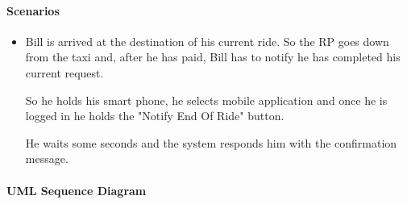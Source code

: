 \paragraph{Scenarios}
\begin{itemize}
	\item Bill is arrived at the destination of his current ride. So the RP goes down from the taxi and, after he has paid, Bill has to notify he has completed his current request. \par So he holds his smart phone, he selects \myTaxiService{} mobile application and once he is logged in he holds the "Notify End Of Ride" button. \par He waits some seconds and the system responds him with the confirmation message.
\end{itemize}
\paragraph{UML Sequence Diagram}
